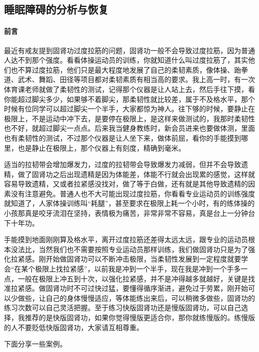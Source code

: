 \subsection{睡眠障碍的分析与恢复}

\paragraph*{前言}

最近有戒友提到固肾功过度拉筋的问题，固肾功一般不会导致过度拉筋，因为普通人达不到那个强度。看看体操运动员的训练，你就知道什么叫过度拉筋了，其实他们也不算过度拉筋，他们只是最大程度地发展了自己的柔韧素质，像体操、跆拳道、武术、舞蹈、田径等项目都对柔韧素质有相当高的要求。我上高一时，有一次体育课老师就做了柔韧性的测试，记得那个仪器是让人站上去，然后手往下摸，看你能超过脚尖多少，如果够不着脚尖，那柔韧性就比较差，属于不及格水平，那个时候有位同学可以超过脚尖一个半手，大家都惊为神人。往下够的时候，要静止在极限上，不是运动中冲下去，是要停在极限上，是这样来做测试的，我那时柔韧性也不好，就超过脚尖一点点。后来我当健身教练时，新会员进来也要做体测，里面也有柔韧性的测试，不过那个仪器是让人坐下来，做体前屈，看你的手能摸到哪里，也是静止在极限上，那个仪器上有刻度，精确到毫米。

适当的拉韧带会增加爆发力，过度的拉韧带会导致爆发力减弱，但并不会导致遗精，做了固肾功之后出现遗精是因为体能差，体能不行就会出现累的感觉，这样就容易导致遗精，又或者拉紧感没找对，做了等于白做，还有就是其他导致遗精的因素没有注意避免。普通人也不大可能出现过度拉筋，你看看专业运动员的训练强度就知道了，人家体操训练叫“耗腿”，甚至要求在极限上耗一个小时，有的练体操的小孩那真是咬牙流泪在坚持，表情极为痛苦，非常非常不容易，真是台上一分钟台下十年功。

手能摸到地面刚刚算及格水平，离开过度拉筋还差得太远太远，跟专业的运动员根本没法比，当然我们也不需要按照专业运动员那样训练，我们做固肾功只是为了强化拉紧感。刚开始做固肾功可以不断冲击极限，当柔韧性发展到一定程度就要学会“在某个极限上找拉紧感”，以前我是冲到一个半手，现在我是冲到一个手多一点，一般在极限上冲五到十次，以强化拉紧感，并不是冲得越多就越好，关键是找准拉紧感。做固肾功时不可过快过猛，要懂得循序渐进，避免过于劳累，刚开始可以少做些，让自己的身体慢慢适应，等体能练出来后，可以稍微多做些，固肾功的练习次数可以自己灵活把握。至于练习快版固肾功还是慢版固肾功，可以自己选择，我推荐的是快版固肾功，如果你觉得慢版更适合你，那你就练慢版的。练慢版的人不要贬低快版固肾功，大家请互相尊重。

下面分享一些案例。

